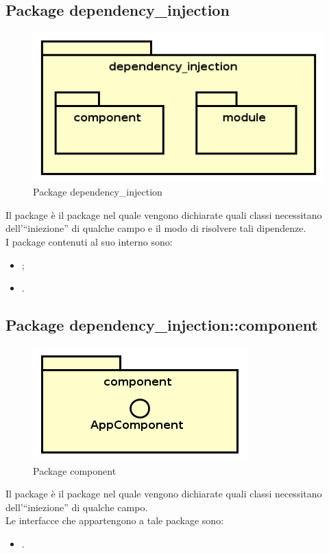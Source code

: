 \documentclass[../Tesi.tex]{subfiles}
\begin{document}
	\subsection{Package dependency\_injection}
		\begin{figure}[H]
			\centering
			\includegraphics[scale=0.6]{images/package_diagrams/dependency_injection}
				\caption{Package dependency\_injection}
		\end{figure}
		Il package  è il package nel quale vengono dichiarate quali classi necessitano dell'``iniezione'' di qualche campo e il modo di risolvere tali dipendenze. \\
		I package contenuti al suo interno sono:
		\begin{itemize}
			\item {};
			\item {}.
		\end{itemize}

	\subsection{Package dependency\_injection::component}
		\begin{figure}[H]
			\centering
			\includegraphics[scale=0.6]{images/package_diagrams/component}
				\caption{Package component}
		\end{figure}
		Il package  è il package nel quale vengono dichiarate quali classi necessitano dell'``iniezione'' di qualche campo. \\
		Le interfacce che appartengono a tale package sono:
		\begin{itemize}
			\item {}.
		\end{itemize}	
\end{document}
